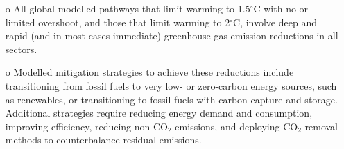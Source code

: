 \begin{frame}
\begin{scriptsize}
\begin{columns}
\begin{itemize}
        \item[o] All global modelled pathways that limit warming to 1.5$^\circ$C with no or limited overshoot, and those that limit warming to 2$^\circ$C, involve deep and rapid (and in most cases immediate) greenhouse gas emission reductions in all sectors. 
        
        \item[o] Modelled mitigation strategies to achieve these reductions include transitioning from fossil fuels to very low- or zero-carbon energy sources, such as renewables, or transitioning to fossil fuels with carbon capture and storage. Additional strategies require reducing energy demand and consumption, improving efficiency, reducing non-CO$_2$ emissions, and deploying CO$_2$ removal methods to counterbalance residual emissions.

      \end{itemize}

    \end{columns}

  \end{scriptsize}
  \end{frame} 

